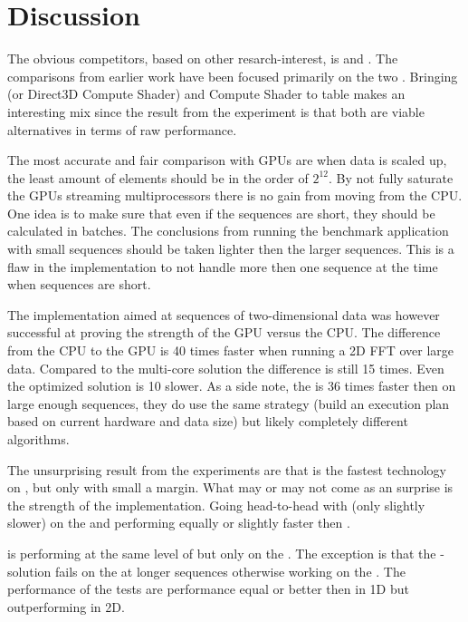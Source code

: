 \newpage

\section{Discussion}

The obvious competitors, based on other resarch-interest, is {\CU} and {\OCL}. The comparisons from earlier work have been focused primarily on the two \cite{Fang2011b}\cite{Karimi2010}\cite{Park2011}\cite{Su2012b}. Bringing {\DX} (or Direct3D Compute Shader) and {\GL} Compute Shader to table makes an interesting mix since the result from the experiment is that both are viable alternatives in terms of raw performance.

The most accurate and fair comparison with GPUs are when data is scaled up, the least amount of elements should be in the order of $2^{12}$. By not fully saturate the GPUs streaming multiprocessors there is no gain from moving from the CPU. One idea is to make sure that even if the sequences are short, they should be calculated in batches. The conclusions from running the benchmark application with small sequences should be taken lighter then the larger sequences. This is a flaw in the implementation to not handle more then one sequence at the time when sequences are short.

The implementation aimed at sequences of two-dimensional data was however successful at proving the strength of the GPU versus the CPU. The difference from the CPU to the GPU is 40 times faster when running a 2D FFT over large data. Compared to the multi-core {\OMP} solution the difference is still 15 times. Even the optimized {\FFTW} solution is 10 slower. As a side note, the {\CUFFT} is 36 times faster then {\FFTW} on large enough sequences, they do use the same strategy (build an execution plan based on current hardware and data size) but likely completely different algorithms.

The unsurprising result from the experiments are that {\CU} is the fastest technology on {\NVCARD}, but only with small a margin. What may or may not come as an surprise is the strength of the {\DX} implementation. Going head-to-head with {\CU} (only slightly slower) on the {\NVCARD} and performing equally or slightly faster then {\OCL}.

{\GL} is performing at the same level of {\DX} but only on the {\AMDCARD}. The exception is that the {\GL}-solution fails on the {\AMDCARD} at longer sequences otherwise working on the {\NVCARD}. The performance of the {\GL} tests are performance equal or better then {\OCL} in 1D but outperforming {\OCL} in 2D.

